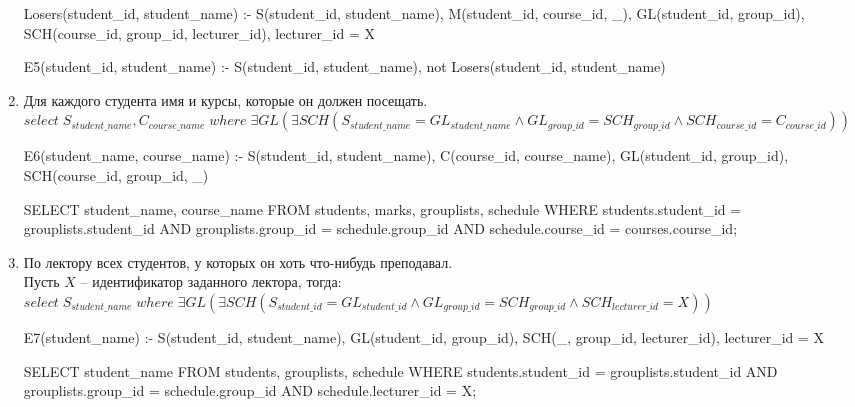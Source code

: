 \documentclass[10pt, a4paper]{article}
\begin{document}
\begin{enumerate}
{	\begin{prolog}
Losers(student_id, student_name) :- S(student_id, student_name),
	M(student_id, course_id, _), GL(student_id, group_id),
	SCH(course_id, group_id, lecturer_id), lecturer_id = X

E5(student_id, student_name) :- S(student_id, student_name),
	not Losers(student_id, student_name)
	\end{prolog}
	}

	\item {Для каждого студента имя и курсы, которые он должен посещать.\\
	$select \; S_{student\_name}, C_{course\_name} \; where \; \exists GL (\exists SCH (S_{student\_name} = GL_{student\_name} \wedge GL_{group\_id} = SCH_{group\_id} \wedge SCH_{course\_id} = C_{course\_id}))$

	\begin{prolog}
E6(student_name, course_name) :- S(student_id, student_name),
	C(course_id, course_name), GL(student_id, group_id),
	SCH(course_id, group_id, _)
	\end{prolog}

	\begin{sql}
SELECT student_name, course_name
FROM students, marks, grouplists, schedule
WHERE students.student_id = grouplists.student_id AND
	grouplists.group_id = schedule.group_id AND
	schedule.course_id = courses.course_id;
	\end{sql}
	}

	\item {По лектору всех студентов, у которых он хоть что-нибудь преподавал.\\
	Пусть $X$ -- идентификатор заданного лектора, тогда:\\
	$select \; S_{student\_name} \; where \; \exists GL (\exists SCH (S_{student\_id} = GL_{student\_id} \wedge GL_{group\_id} = SCH_{group\_id} \wedge SCH_{lecturer\_id} = X))$

	\begin{prolog}
E7(student_name) :- S(student_id, student_name),
	GL(student_id, group_id), SCH(_, group_id, lecturer_id),
	lecturer_id = X
	\end{prolog}

	\begin{sql}
SELECT student_name
FROM students, grouplists, schedule
WHERE students.student_id = grouplists.student_id AND
	grouplists.group_id = schedule.group_id AND
	schedule.lecturer_id = X;
	\end{sql}
	}


\end{enumerate}
\end{document}
